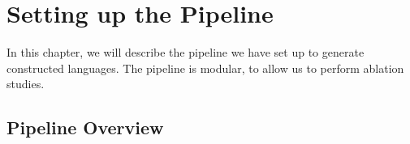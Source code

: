 \chapter{Setting up the Pipeline}\label{chapter:pipeline}

In this chapter, we will describe the pipeline we have set up to generate constructed languages. The pipeline is modular, to allow us to perform
ablation studies.

\section{Pipeline Overview}

